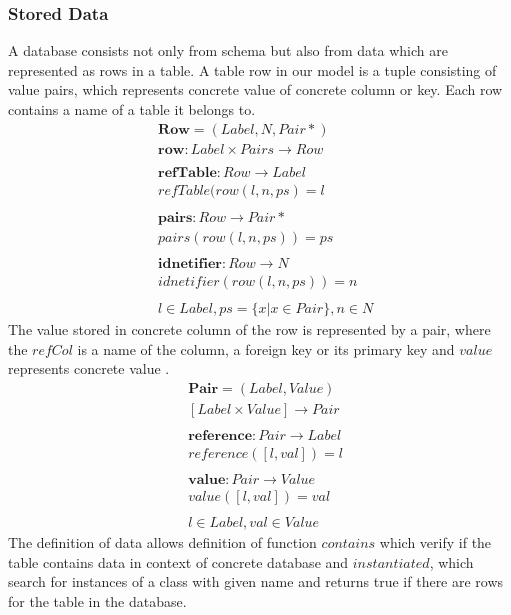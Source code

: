 \documentclass[11pt]{article}
\begin{document}
\subsubsection{Stored Data} 
A database consists not only from schema but also from data which are represented as rows in a table. A table row in our model is a tuple consisting of value pairs, which represents concrete value of concrete column or key. Each row contains a name of a table it belongs to.
\begin{align*}
&	\mathbf{Row} = (Label, N, Pair*) \\
&	\mathbf{row} : Label \times Pairs \rightarrow Row \\ \\
&	\mathbf{refTable} : Row \rightarrow Label \\
&	refTable(row(l, n, ps) = l \\ \\
&	\mathbf{pairs} : Row \rightarrow Pair* \\
&	pairs(row(l, n, ps)) = ps \\ \\
&	\mathbf{idnetifier} : Row \rightarrow N \\
&	idnetifier(row(l, n, ps)) = n \\ \\
&	 l \in Label, ps = \{ x | x \in Pair\}, n \in N
\end{align*}
The value stored in concrete column of the row is represented by a pair, where the $refCol$ is a name of the column, a foreign key or its primary key and $value$ represents concrete value .
\begin{align*}
&	\mathbf{Pair} = (Label, Value) \\
&	[Label \times Value] \rightarrow Pair\\ \\
&	\mathbf{reference} : Pair \rightarrow Label \\
&	reference([l,val]) = l \\ \\
&	\mathbf{value} : Pair \rightarrow Value \\ 
&	value([l,val]) = val \\ \\
&	l \in Label, val \in Value
\end{align*}
The definition of data allows definition of function $contains$ which verify if the table contains data in context of concrete database and $instantiated$, which search for instances of a class with given name and returns true if there are rows for the table in the database.
\end{document}
